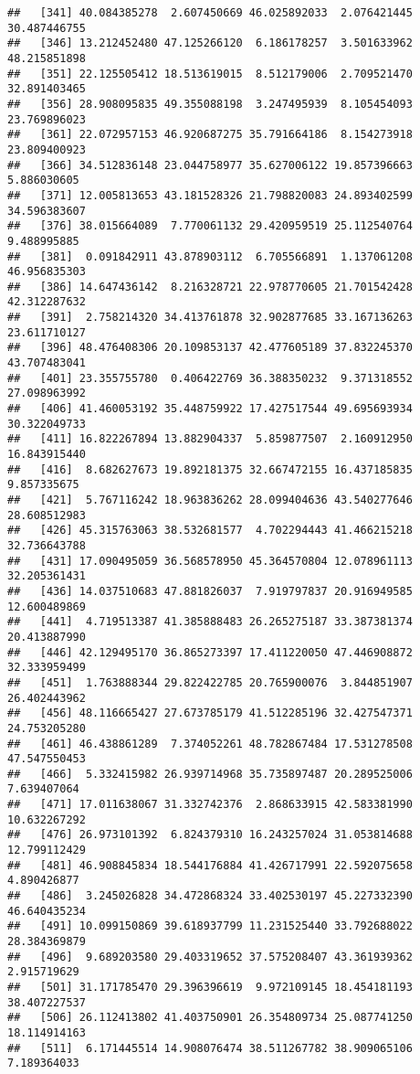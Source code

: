 \documentclass[
]{article}
\begin{document}
\begin{verbatim}
##   [341] 40.084385278  2.607450669 46.025892033  2.076421445 30.487446755
##   [346] 13.212452480 47.125266120  6.186178257  3.501633962 48.215851898
##   [351] 22.125505412 18.513619015  8.512179006  2.709521470 32.891403465
##   [356] 28.908095835 49.355088198  3.247495939  8.105454093 23.769896023
##   [361] 22.072957153 46.920687275 35.791664186  8.154273918 23.809400923
##   [366] 34.512836148 23.044758977 35.627006122 19.857396663  5.886030605
##   [371] 12.005813653 43.181528326 21.798820083 24.893402599 34.596383607
##   [376] 38.015664089  7.770061132 29.420959519 25.112540764  9.488995885
##   [381]  0.091842911 43.878903112  6.705566891  1.137061208 46.956835303
##   [386] 14.647436142  8.216328721 22.978770605 21.701542428 42.312287632
##   [391]  2.758214320 34.413761878 32.902877685 33.167136263 23.611710127
##   [396] 48.476408306 20.109853137 42.477605189 37.832245370 43.707483041
##   [401] 23.355755780  0.406422769 36.388350232  9.371318552 27.098963992
##   [406] 41.460053192 35.448759922 17.427517544 49.695693934 30.322049733
##   [411] 16.822267894 13.882904337  5.859877507  2.160912950 16.843915440
##   [416]  8.682627673 19.892181375 32.667472155 16.437185835  9.857335675
##   [421]  5.767116242 18.963836262 28.099404636 43.540277646 28.608512983
##   [426] 45.315763063 38.532681577  4.702294443 41.466215218 32.736643788
##   [431] 17.090495059 36.568578950 45.364570804 12.078961113 32.205361431
##   [436] 14.037510683 47.881826037  7.919797837 20.916949585 12.600489869
##   [441]  4.719513387 41.385888483 26.265275187 33.387381374 20.413887990
##   [446] 42.129495170 36.865273397 17.411220050 47.446908872 32.333959499
##   [451]  1.763888344 29.822422785 20.765900076  3.844851907 26.402443962
##   [456] 48.116665427 27.673785179 41.512285196 32.427547371 24.753205280
##   [461] 46.438861289  7.374052261 48.782867484 17.531278508 47.547550453
##   [466]  5.332415982 26.939714968 35.735897487 20.289525006  7.639407064
##   [471] 17.011638067 31.332742376  2.868633915 42.583381990 10.632267292
##   [476] 26.973101392  6.824379310 16.243257024 31.053814688 12.799112429
##   [481] 46.908845834 18.544176884 41.426717991 22.592075658  4.890426877
##   [486]  3.245026828 34.472868324 33.402530197 45.227332390 46.640435234
##   [491] 10.099150869 39.618937799 11.231525440 33.792688022 28.384369879
##   [496]  9.689203580 29.403319652 37.575208407 43.361939362  2.915719629
##   [501] 31.171785470 29.396396619  9.972109145 18.454181193 38.407227537
##   [506] 26.112413802 41.403750901 26.354809734 25.087741250 18.114914163
##   [511]  6.171445514 14.908076474 38.511267782 38.909065106  7.189364033

\end{verbatim}
\end{document}
